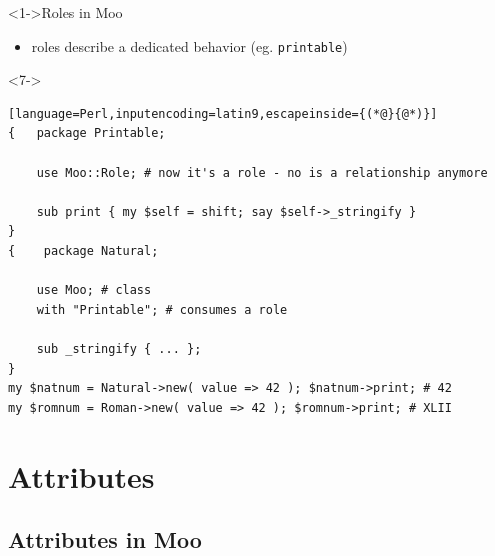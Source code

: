 \documentclass[ngerman,xcolor={table,dvipsnames},smaller,compress,hyperref={bookmarks,colorlinks}]{beamer}
\begin{document}
\begin{frame}[t,fragile]

\begin{block}<1->{Roles in Moo}
\begin{itemize}
\item roles describe a dedicated behavior (eg. \texttt{printable})
\end{itemize}
\end{block}

\begin{block}<7->{}
\scriptsize
\begin{lstlisting}[language=Perl,inputencoding=latin9,escapeinside={(*@}{@*)}]
{   package Printable;

    use Moo::Role; # now it's a role - no is a relationship anymore

    sub print { my $self = shift; say $self->_stringify }
}
{    package Natural;

    use Moo; # class
    with "Printable"; # consumes a role

    sub _stringify { ... };
}
my $natnum = Natural->new( value => 42 ); $natnum->print; # 42
my $romnum = Roman->new( value => 42 ); $romnum->print; # XLII
\end{lstlisting}
\end{block}

\end{frame}

\section{Attributes}

\subsection{Attributes in Moo}
\end{document}
